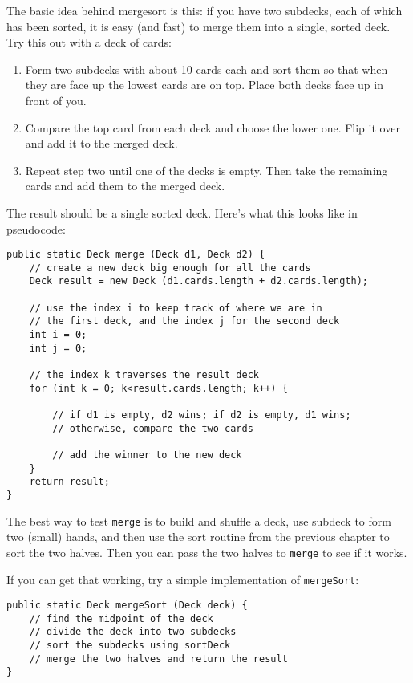 \documentclass{book}
\begin{document}
The basic idea behind mergesort is this: if you have two subdecks,
each of which has been sorted, it is easy (and fast) to merge them
into a single, sorted deck.  Try this out with a deck of cards:

\begin{enumerate}

\item Form two subdecks with about 10 cards each and sort
them so that when they are face up the lowest cards are on
top.  Place both decks face up in front of you.

\item Compare the top card from each deck and choose the
lower one.  Flip it over and add it to the merged deck.

\item Repeat step two until one of the decks is empty.
Then take the remaining cards and add them to the merged
deck.

\end{enumerate}

The result should be a single sorted deck.  Here's what this
looks like in pseudocode:

\begin{verbatim}
public static Deck merge (Deck d1, Deck d2) {
    // create a new deck big enough for all the cards
    Deck result = new Deck (d1.cards.length + d2.cards.length);

    // use the index i to keep track of where we are in
    // the first deck, and the index j for the second deck
    int i = 0;
    int j = 0;
		
    // the index k traverses the result deck
    for (int k = 0; k<result.cards.length; k++) {
			
        // if d1 is empty, d2 wins; if d2 is empty, d1 wins;
        // otherwise, compare the two cards
			
        // add the winner to the new deck
    }
    return result;
}
\end{verbatim}

The best way to test {\tt merge} is to build and shuffle a deck,
use subdeck to form two (small) hands, and then use the sort
routine from the previous chapter to sort the two halves.  Then
you can pass the two halves to {\tt merge} to see if it works.


If you can get that working, try a simple implementation of
{\tt mergeSort}:

\begin{verbatim}
public static Deck mergeSort (Deck deck) {
    // find the midpoint of the deck
    // divide the deck into two subdecks
    // sort the subdecks using sortDeck
    // merge the two halves and return the result
}
\end{verbatim}
\end{document}
